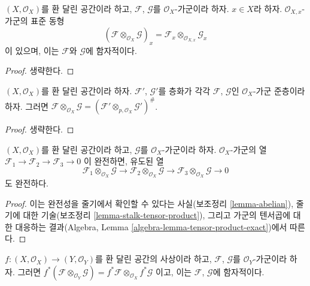 \begin{lemma}
\label{lemma-stalk-tensor-product}
$(X, \mathcal{O}_X)$를 환 달린 공간이라 하고,
$\mathcal{F}$, $\mathcal{G}$를 $\mathcal{O}_X$-가군이라 하자.
$x \in X$라 하자. $\mathcal{O}_{X, x}$-가군의 표준 동형
$$
(\mathcal{F} \otimes_{\mathcal{O}_X} \mathcal{G})_x
=
\mathcal{F}_x \otimes_{\mathcal{O}_{X, x}} \mathcal{G}_x
$$
이 있으며, 이는 $\mathcal{F}$와 $\mathcal{G}$에 함자적이다.
\end{lemma}

\begin{proof}
생략한다.
\end{proof}

\begin{lemma}
\label{lemma-tensor-product-sheafification}
$(X, \mathcal{O}_X)$를 환 달린 공간이라 하자.
$\mathcal{F}'$, $\mathcal{G}'$를 층화가 각각 $\mathcal{F}$, $\mathcal{G}$인
$\mathcal{O}_X$-가군 준층이라 하자. 그러면
$\mathcal{F} \otimes_{\mathcal{O}_X} \mathcal{G} =
(\mathcal{F}' \otimes_{p, \mathcal{O}_X} \mathcal{G}')^\#$.
\end{lemma}

\begin{proof}
생략한다.
\end{proof}


\begin{lemma}
\label{lemma-tensor-product-exact}
$(X, \mathcal{O}_X)$를 환 달린 공간이라 하고,
$\mathcal{G}$를 $\mathcal{O}_X$-가군이라 하자.
$\mathcal{O}_X$-가군의 열
$\mathcal{F}_1
\to \mathcal{F}_2
\to \mathcal{F}_3
\to 0$
이 완전하면, 유도된 열
$$
\mathcal{F}_1 \otimes_{\mathcal{O}_X} \mathcal{G} \to
\mathcal{F}_2 \otimes_{\mathcal{O}_X} \mathcal{G} \to
\mathcal{F}_3 \otimes_{\mathcal{O}_X} \mathcal{G} \to
0
$$
도 완전하다.
\end{lemma}

\begin{proof}
이는 완전성을 줄기에서 확인할 수 있다는 사실(보조정리
\ref{lemma-abelian}), 줄기에 대한 기술(보조정리
\ref{lemma-stalk-tensor-product}), 그리고 가군의 텐서곱에 대한
대응하는 결과(Algebra, Lemma \ref{algebra-lemma-tensor-product-exact})에서 따른다.
\end{proof}

\begin{lemma}
\label{lemma-tensor-product-pullback}
$f : (X, \mathcal{O}_X) \to (Y, \mathcal{O}_Y)$를
환 달린 공간의 사상이라 하고, $\mathcal{F}$, $\mathcal{G}$를
$\mathcal{O}_Y$-가군이라 하자. 그러면
$f^*(\mathcal{F} \otimes_{\mathcal{O}_Y} \mathcal{G})
= f^*\mathcal{F} \otimes_{\mathcal{O}_X} f^*\mathcal{G}$
이고, 이는 $\mathcal{F}$, $\mathcal{G}$에 함자적이다.
\end{lemma}

